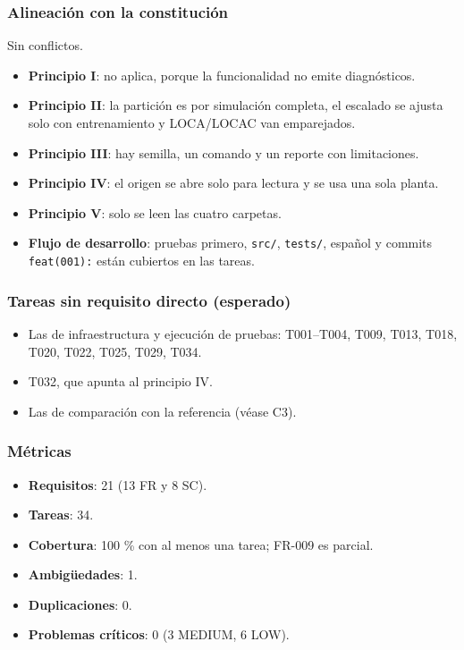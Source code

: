 \documentclass[12pt,a4paper]{article}
\providecommand{\tightlist}{\setlength{\itemsep}{0pt}\setlength{\parskip}{0pt}}
\newenvironment{documentogenerado}[2]{%
  \def\doccomando{#1}\def\docruta{#2}%
  \par\begingroup\small\setstretch{1.15}\sloppy%
}{\endgroup\par\medskip}
\begin{document}
\begin{documentogenerado}{/speckit-analyze}{specs\slash 001-preparacion-datos\slash analisis-inicial.md}
\subsubsection{Alineación con la constitución}

Sin conflictos.

\begin{itemize}
\tightlist
\item
  \textbf{Principio I}: no aplica, porque la funcionalidad no emite diagnósticos.
\item
  \textbf{Principio II}: la partición es por simulación completa, el escalado se ajusta solo con entrenamiento y LOCA/\hspace{0pt}LOCAC van emparejados.
\item
  \textbf{Principio III}: hay semilla, un comando y un reporte con limitaciones.
\item
  \textbf{Principio IV}: el origen se abre solo para lectura y se usa una sola planta.
\item
  \textbf{Principio V}: solo se leen las cuatro carpetas.
\item
  \textbf{Flujo de desarrollo}: pruebas primero, \texttt{src/}, \texttt{tests/}, español y commits \texttt{feat(001):} están cubiertos en las tareas.
\end{itemize}

\subsubsection{Tareas sin requisito directo (esperado)}

\begin{itemize}
\tightlist
\item
  Las de infraestructura y ejecución de pruebas: T001--T004, T009, T013, T018, T020, T022, T025, T029, T034.
\item
  T032, que apunta al principio IV.
\item
  Las de comparación con la referencia (véase C3).
\end{itemize}

\subsubsection{Métricas}

\begin{itemize}
\tightlist
\item
  \textbf{Requisitos}: 21 (13 FR y 8 SC).
\item
  \textbf{Tareas}: 34.
\item
  \textbf{Cobertura}: 100 \% con al menos una tarea; FR-009 es parcial.
\item
  \textbf{Ambigüedades}: 1.
\item
  \textbf{Duplicaciones}: 0.
\item
  \textbf{Problemas críticos}: 0 (3 MEDIUM, 6 LOW).
\end{itemize}


\end{documentogenerado}
\end{document}

